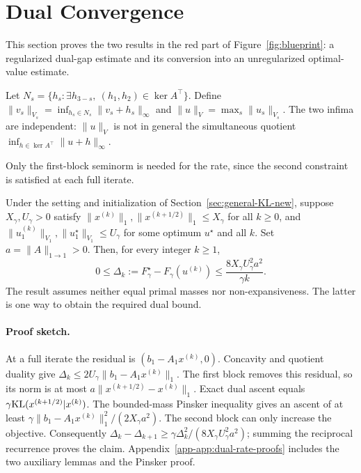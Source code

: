 \section{Dual Convergence}\label{sec:dual-conv}
This section proves the two results in the red part of Figure~\ref{fig:blueprint}: a regularized dual-gap estimate and its conversion into an unregularized optimal-value estimate.
\begin{definition}\label{def:block-seminorm}
Let $N_s=\{h_s:\exists h_{3-s},\ (h_1,h_2)\in\ker A^\top\}$. Define $\|v_s\|_{V_s}=\inf_{h_s\in N_s}\|v_s+h_s\|_\infty$ and $\|u\|_V=\max_s\|u_s\|_{V_s}$. The two infima are independent: $\|u\|_V$ is not in general the simultaneous quotient $\inf_{h\in\ker A^\top}\|u+h\|_\infty$.
\end{definition}
Only the first-block seminorm is needed for the rate, since the second constraint is satisfied at each full iterate.

\begin{theorem}\label{thm:kl-dual-rate}
Under the setting and initialization of Section~\ref{sec:general-KL-new}, suppose $X_\gamma,U_\gamma>0$ satisfy $\|x^{(k)}\|_1,\|x^{(k+1/2)}\|_1\leq X_\gamma$ for all $k\geq0$, and $\|u_1^{(k)}\|_{V_1},\|u_1^\star\|_{V_1}\leq U_\gamma$ for some optimum $u^\star$ and all $k$. Set $a=\|A\|_{1\to1}>0$. Then, for every integer $k\geq1$,
\begin{equation}\label{eq:dual-rate-new}
0\leq\Delta_k:=F_\gamma^\star-F_\gamma(u^{(k)})
\leq\frac{8X_\gamma U_\gamma^2a^2}{\gamma k}.
\end{equation}
The result assumes neither equal primal masses nor non-expansiveness. The latter is one way to obtain the required dual bound.
\end{theorem}
\paragraph{Proof sketch.}
At a full iterate the residual is $(b_1-A_1x^{(k)},0)$. Concavity and quotient duality give $\Delta_k\leq2U_\gamma\|b_1-A_1x^{(k)}\|_1$. The first block removes this residual, so its norm is at most $a\|x^{(k+1/2)}-x^{(k)}\|_1$. Exact dual ascent equals $\gamma\mathrm{KL}(x^{(k+1/2)}|x^{(k)})$. The bounded-mass Pinsker inequality gives an ascent of at least $\gamma\|b_1-A_1x^{(k)}\|_1^2/(2X_\gamma a^2)$. The second block can only increase the objective. Consequently $\Delta_k-\Delta_{k+1}\geq\gamma\Delta_k^2/(8X_\gamma U_\gamma^2a^2)$; summing the reciprocal recurrence proves the claim. Appendix~\ref{app-app:dual-rate-proofs} includes the two auxiliary lemmas and the Pinsker proof.

